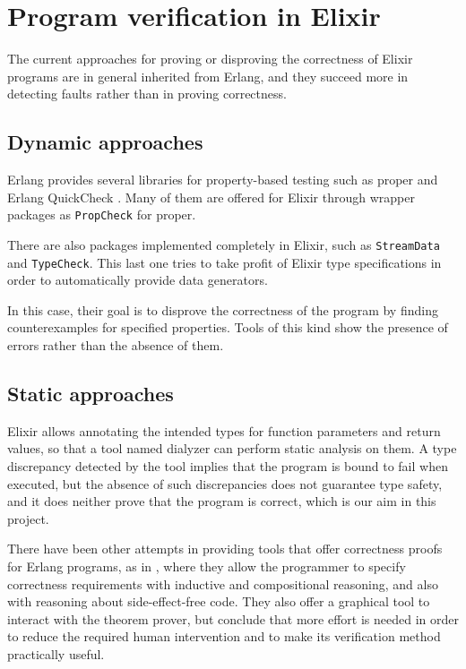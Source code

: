 \section{Program verification in Elixir}

The current approaches for proving or disproving the correctness of Elixir 
programs are in general inherited from Erlang, and they succeed more in 
detecting faults rather than in proving correctness.

\subsection{Dynamic approaches}

Erlang provides several libraries for property-based testing such as
\gls{proper} \citep{proper} and Erlang QuickCheck \citep{quickcheck}. Many of
them are offered for Elixir through wrapper packages as \verb|PropCheck| for
\gls{proper}.

There are also packages implemented completely in Elixir, such as
\verb|StreamData| and \verb|TypeCheck|. This last one tries to take profit of
Elixir type specifications in order to automatically provide data generators.

In this case, their goal is to disprove the correctness of the program by
finding counterexamples for specified properties. Tools of this kind show the
presence of errors rather than the absence of them.

\subsection{Static approaches}
\label{sec:static}

Elixir allows annotating the intended types for function parameters and return
values, so that a tool named \gls{dialyzer} \citep{Dialyzer} can perform static
analysis on them. A type discrepancy detected by the tool implies that the
program is bound to fail when executed, but the absence of such discrepancies
does not guarantee type safety, and it does neither prove that the program is
correct, which is our aim in this project.

There have been other attempts in providing tools that offer correctness proofs
for Erlang programs, as in \cite{erlangveri}, where they allow the programmer to
specify correctness requirements with inductive and compositional reasoning, and
also with reasoning about side-effect-free code. They also offer a graphical
tool to interact with the theorem prover, but conclude that more effort is
needed in order to reduce the required human intervention and to make its
verification method practically useful.
